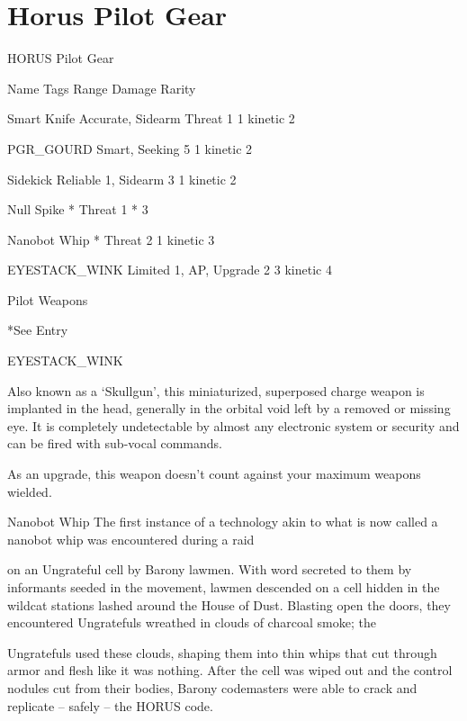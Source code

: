 \section{Horus Pilot Gear}

                                          HORUS Pilot Gear  

 Name                   Tags                                   Range           Damage                Rarity 

 Smart Knife            Accurate, Sidearm                     Threat 1         1 kinetic              2 

 PGR\_GOURD              Smart, Seeking                         5               1 kinetic              2 

 Sidekick               Reliable 1, Sidearm                    3               1 kinetic              2 

 Null Spike             *                                     Threat 1        *                       3 

 Nanobot Whip           *                                     Threat 2         1 kinetic              3 

 EYESTACK\_WINK          Limited 1, AP, Upgrade                 2              3 kinetic               4 

                                                Pilot Weapons  

*See Entry
 

EYESTACK\_WINK  

Also known as a ‘Skullgun’, this miniaturized, superposed charge weapon is implanted in the head,  
generally in the orbital void left by a removed or missing eye. It is completely undetectable by almost any  
electronic system or security and can be fired with sub-vocal commands.   

As an upgrade, this weapon doesn’t count against your maximum weapons wielded.
 

Nanobot Whip  
The first instance of a technology akin to what is now called a nanobot whip was encountered during a raid  

on an Ungrateful cell by Barony lawmen. With word secreted to them by informants seeded in the  
movement, lawmen descended on a cell hidden in the wildcat stations lashed around the House of Dust.  
Blasting open the doors, they encountered Ungratefuls wreathed in clouds of charcoal smoke; the  

Ungratefuls used these clouds, shaping them into thin whips that cut through armor and flesh like it was  
nothing. After the cell was wiped out and the control nodules cut from their bodies, Barony codemasters  
were able to crack and replicate -- safely -- the HORUS code.   

